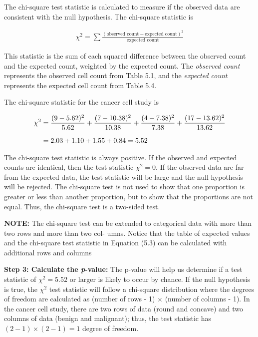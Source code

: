 \documentclass[
]{report}
\begin{document}
The chi-square test statistic is calculated to measure if the observed data are consistent with the null
hypothesis. The chi-square statistic is

\begin{align} \label{5.3}
\chi^2 = \sum \frac{(\text{observed count} - \text{expected count})^2}{\text{expected count}} 
\tag{5.3}
\end{align}

This statistic is the sum of each squared difference between the observed count and the expected count,
weighted by the expected count. The \emph{observed count} represents the observed cell count from Table 5.1, and
the \emph{expected count} represents the expected cell count from Table 5.4.

The chi-square statistic for the cancer cell study is

\begin{align}
\chi^2
&= \frac{(9 - 5.62)^2}{5.62} + \frac{(7 - 10.38)^2}{10.38} + \frac{(4 - 7.38)^2}{7.38} + \frac{(17 - 13.62)^2}{13.62} \\[6pt] \notag
&= 2.03 + 1.10 + 1.55 + 0.84 = 5.52 \notag
\end{align}

The chi-square test statistic is always positive. If the observed and expected counts are identical, then
the test statistic \(\chi^2 = 0\). If the observed data are far from the expected data, the test statistic will be large
and the null hypothesis will be rejected. The chi-square test is not used to show that one proportion is greater
or less than another proportion, but to show that the proportions are not equal. Thus, the chi-square test is a
two-sided test.

\large

\textbf{NOTE:}
The chi-square test can be extended to categorical data with more than two rows and more than two col-
umns. Notice that the table of expected values and the chi-square test statistic in Equation (5.3) can be
calculated with additional rows and columns
\normalsize

\textbf{Step 3: Calculate the \emph{p}-value:}
The p-value will help us determine if a test statistic of \(\chi^2 = 5.52\) or larger is likely to occur by chance. If
the null hypothesis is true, the \(\chi^2\) test statistic will follow a chi-square distribution where the degrees of
freedom are calculated as (number of rows - 1) \(\times\) (number of columns - 1). In the cancer cell study,
there are two rows of data (round and concave) and two columns of data (benign and malignant); thus,
the test statistic has \((2- 1) \times (2- 1) = 1\) degree of freedom.
\end{document}
